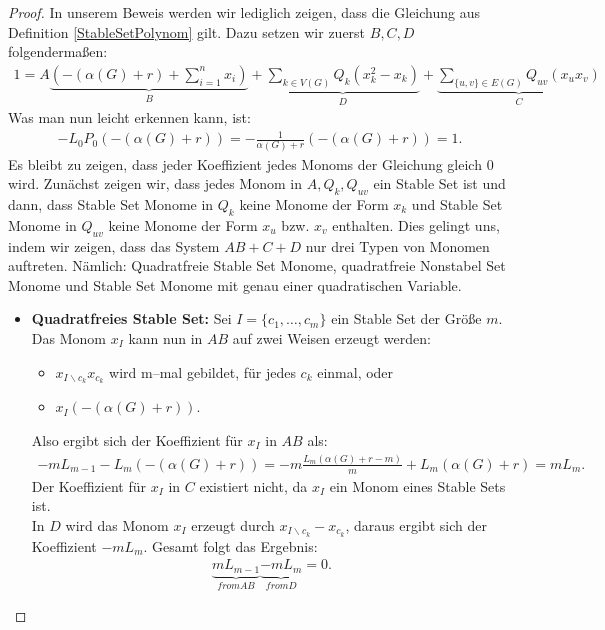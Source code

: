 \begin{proof}
In unserem Beweis werden wir lediglich zeigen, dass die Gleichung aus Definition \ref{StableSetPolynom} gilt. Dazu setzen wir zuerst $B,C,D$ folgendermaßen:
\begin{align*}
1 = A\underbrace{\left(-(\alpha(G) + r) + \sum_{i=1}^nx_i\right)}_{B}+\underbrace{\sum_{k \in V(G)} Q_k(x_k^2-x_k)}_{D}+\underbrace{\sum_{\{u,v\}\in E(G)} Q_{uv}(x_ux_v)}_{C}
\end{align*}
Was man nun leicht erkennen kann, ist:
\begin{align*}
-L_0P_0\left(-(\alpha(G)+r)\right) = - \frac{1}{\alpha(G)+r}\left(-(\alpha(G)+r)\right) = 1.
\end{align*}
Es bleibt zu zeigen, dass jeder Koeffizient jedes Monoms der Gleichung gleich $0$ wird. Zunächst zeigen wir, dass jedes Monom in $A,Q_k,Q_{uv}$ ein Stable Set ist und dann, dass Stable Set Monome in $Q_k$ keine Monome der Form $x_k$ und Stable Set Monome in $Q_{uv}$ keine Monome der Form $x_u$ bzw. $x_v$ enthalten. Dies gelingt uns, indem wir zeigen, dass das System $AB+C+D$  nur drei Typen von Monomen auftreten. Nämlich: Quadratfreie Stable Set Monome, quadratfreie Nonstabel Set Monome und Stable Set Monome mit genau einer quadratischen Variable.\\
\begin{itemize}
\item \textbf{Quadratfreies Stable Set:} Sei $I=\{c_1,\ldots,c_m\}$ ein Stable Set der Größe $m$. Das Monom $x_I$ kann nun in $AB$ auf zwei Weisen erzeugt werden:\\
\begin{itemize}
\item $x_{I\backslash c_k}x_{c_k}$ wird m--mal gebildet, für jedes $c_k$ einmal, oder
\item $x_I\left(-(\alpha(G)+r)\right)$.
\end{itemize}
Also ergibt sich der Koeffizient für $x_I$ in \textbf{$AB$} als:
\begin{align*}
-mL_{m-1}-L_m\left(-(\alpha(G)+r)\right) = -m \frac{L_m(\alpha(G)+r-m)}{m} + L_m(\alpha(G)+r) = mL_m.
\end{align*}
Der Koeffizient für $x_I$ in \textbf{$C$} existiert nicht, da $x_I$ ein Monom eines Stable Sets ist.\\
In \textbf{$D$} wird das Monom $x_I$ erzeugt durch $x_{I\backslash c_k}-x_{c_k}$, daraus ergibt sich der Koeffizient $-mL_m$. Gesamt folgt das Ergebnis:
\begin{align*}
\underbrace{mL_{m-1}}_{from AB}  \underbrace{-mL_m}_{from D} = 0.

\end{align*}
\end{itemize}
\end{proof}
